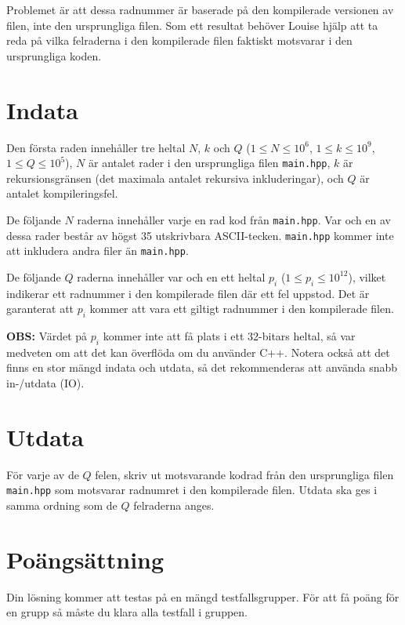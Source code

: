 Problemet är att dessa radnummer är baserade på den kompilerade versionen av filen, inte den ursprungliga filen. 
Som ett resultat behöver Louise hjälp att ta reda på vilka felraderna i den kompilerade filen faktiskt motsvarar i
den ursprungliga koden.

\section*{Indata}
\noindent
Den första raden innehåller tre heltal $N$, $k$ och $Q$
($1 \leq N \leq 10^6$, $1 \leq k \leq 10^9$, $1 \leq Q \leq 10^5$),
$N$ är antalet rader i den ursprungliga filen \texttt{main.hpp}, 
$k$ är rekursionsgränsen (det maximala antalet rekursiva inkluderingar), och $Q$ är antalet kompileringsfel.

De följande $N$ raderna innehåller varje en rad kod från \texttt{main.hpp}. Var och en av dessa rader består av högst
35 utskrivbara ASCII-tecken. \texttt{main.hpp} kommer inte att inkludera andra filer än \texttt{main.hpp}.

De följande $Q$ raderna innehåller var och en ett heltal $p_i$ ($1 \leq p_i \leq 10^{12}$), vilket indikerar ett
radnummer i den kompilerade filen där ett fel uppstod. Det är garanterat att $p_i$ kommer att vara ett giltigt
radnummer i den kompilerade filen.

\textbf{OBS: } Värdet på $p_i$ kommer inte att få plats i ett 32-bitars heltal, så var medveten om att det kan
överflöda om du använder C++. Notera också att det finns en stor mängd indata och utdata, så det rekommenderas
att använda snabb in-/utdata (IO).

\section*{Utdata}
\noindent
För varje av de $Q$ felen, skriv ut motsvarande kodrad från den ursprungliga filen \texttt{main.hpp}
som motsvarar radnumret i den kompilerade filen. 
Utdata ska ges i samma ordning som de $Q$ felraderna anges.

\section*{Poängsättning}
Din lösning kommer att testas på en mängd testfallsgrupper.
För att få poäng för en grupp så måste du klara alla testfall i gruppen.

